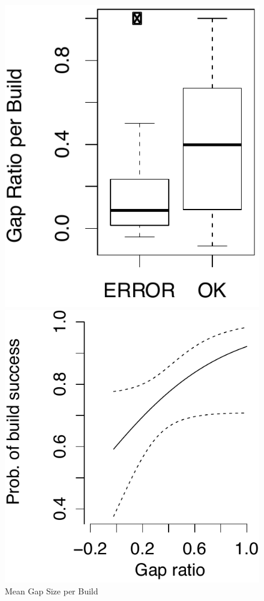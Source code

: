\begin{figure}[t]
\begin{minipage}[b]{0.4\linewidth}
	\centering	
	\includegraphics[scale=0.372]{figures/boxplot_meangapsize}
	\caption{Mean Gap Size per Build}
	\label{fig:gapsizes}
\end{minipage}
\hspace{0.5cm}
\begin{minipage}[b]{0.4\linewidth}
	\centering
	\includegraphics[scale=0.372]{figures/prob_gapsize_g1}

\end{minipage}
\end{figure}
